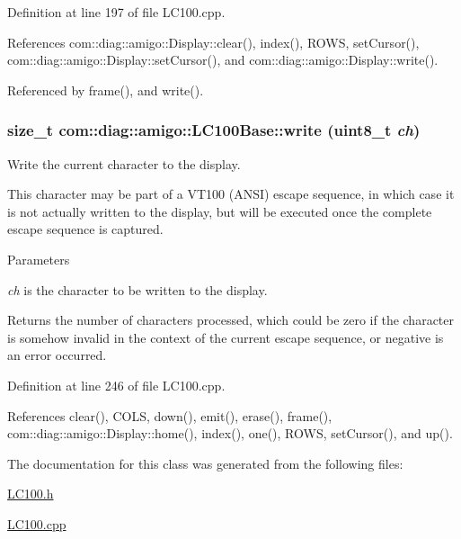 Definition at line 197 of file LC100.cpp.



References com::diag::amigo::Display::clear(), index(), ROWS, setCursor(), com::diag::amigo::Display::setCursor(), and com::diag::amigo::Display::write().



Referenced by frame(), and write().

\hypertarget{classcom_1_1diag_1_1amigo_1_1LC100Base_aa65643803194c15f83e0204d3523ec7e}{
\subsubsection[{write}]{\setlength{\rightskip}{0pt plus 5cm}size\_\-t com::diag::amigo::LC100Base::write (uint8\_\-t {\em ch})}}
\label{classcom_1_1diag_1_1amigo_1_1LC100Base_aa65643803194c15f83e0204d3523ec7e}


Write the current character to the display. 

This character may be part of a VT100 (ANSI) escape sequence, in which case it is not actually written to the display, but will be executed once the complete escape sequence is captured. 
\begin{DoxyParams}{Parameters}
\item[{\em ch}]is the character to be written to the display. \end{DoxyParams}
\begin{DoxyReturn}{Returns}
the number of characters processed, which could be zero if the character is somehow invalid in the context of the current escape sequence, or negative is an error occurred. 
\end{DoxyReturn}


Definition at line 246 of file LC100.cpp.



References clear(), COLS, down(), emit(), erase(), frame(), com::diag::amigo::Display::home(), index(), one(), ROWS, setCursor(), and up().



The documentation for this class was generated from the following files:\begin{DoxyCompactItemize}
\item 
\hyperlink{LC100_8h}{LC100.h}\item 
\hyperlink{LC100_8cpp}{LC100.cpp}\end{DoxyCompactItemize}
